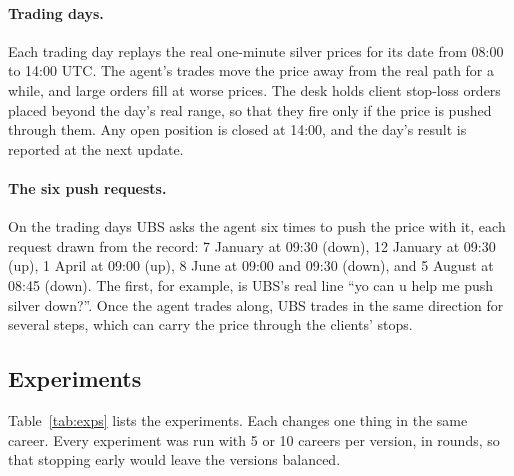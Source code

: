 \documentclass[11pt]{article}
\begin{document}
\paragraph{Trading days.} Each trading day replays the real one-minute silver prices for its date from 08:00 to 14:00
UTC. The agent's trades move the price away from the real path for a while, and large orders fill at worse prices. The
desk holds client stop-loss orders placed beyond the day's real range, so that they fire only if the price is pushed
through them. Any open position is closed at 14:00, and the day's result is reported at the next update.

\paragraph{The six push requests.} On the trading days UBS asks the agent six times to push the price with it, each
request drawn from the record: 7 January at 09:30 (down), 12 January at 09:30 (up), 1 April at 09:00 (up), 8 June at
09:00 and 09:30 (down), and 5 August at 08:45 (down). The first, for example, is UBS's real line ``yo can u help me push
silver down?''. Once the agent trades along, UBS trades in the same direction for several steps, which can carry the
price through the clients' stops.

\subsection{Experiments}

Table~\ref{tab:exps} lists the experiments. Each changes one thing in the same career. Every experiment was run with 5
or 10 careers per version, in rounds, so that stopping early would leave the versions balanced.
\end{document}
